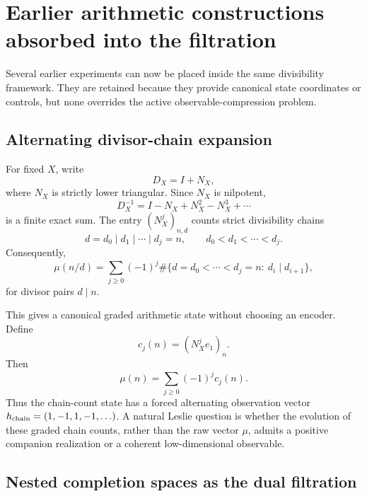 \documentclass[11pt]{amsart}
\numberwithin{equation}{section}
\theoremstyle{plain}
\theoremstyle{definition}
\theoremstyle{remark}
\begin{document}
\section{Earlier arithmetic constructions absorbed into the filtration}
\label{sec:v9_historical_arithmetic_routes}

Several earlier experiments can now be placed inside the same divisibility framework.  They are
retained because they provide canonical state coordinates or controls, but none overrides the
active observable-compression problem.

\subsection{Alternating divisor-chain expansion}

For fixed $X$, write
\[
D_X=I+N_X,
\]
where $N_X$ is strictly lower triangular.  Since $N_X$ is nilpotent,
\begin{equation}
\boxed{
D_X^{-1}=I-N_X+N_X^2-N_X^3+\cdots
}
\label{eq:v9_chain_inverse}
\end{equation}
is a finite exact sum.  The entry $(N_X^j)_{n,d}$ counts strict divisibility chains
\[
d=d_0\mid d_1\mid\cdots\mid d_j=n,
\qquad d_0<d_1<\cdots<d_j.
\]
Consequently,
\begin{equation}
\mu(n/d)=
\sum_{j\ge0}(-1)^j
\#\{d=d_0<\cdots<d_j=n:\ d_i\mid d_{i+1}\},
\label{eq:v9_mu_chain_sum}
\end{equation}
for divisor pairs $d\mid n$.

This gives a canonical graded arithmetic state without choosing an encoder.  Define
\begin{equation}
c_j(n)=(N_X^je_1)_n.
\label{eq:v9_chain_count_state}
\end{equation}
Then
\begin{equation}
\boxed{\mu(n)=\sum_{j\ge0}(-1)^jc_j(n).}
\label{eq:v9_chain_observable}
\end{equation}
Thus the chain-count state has a forced alternating observation vector
$h_{\rm chain}=(1,-1,1,-1,\ldots)$.  A natural Leslie question is whether the evolution of these
graded chain counts, rather than the raw vector $\mu$, admits a positive companion realization or
a coherent low-dimensional observable.

\subsection{Nested completion spaces as the dual filtration}
\end{document}

